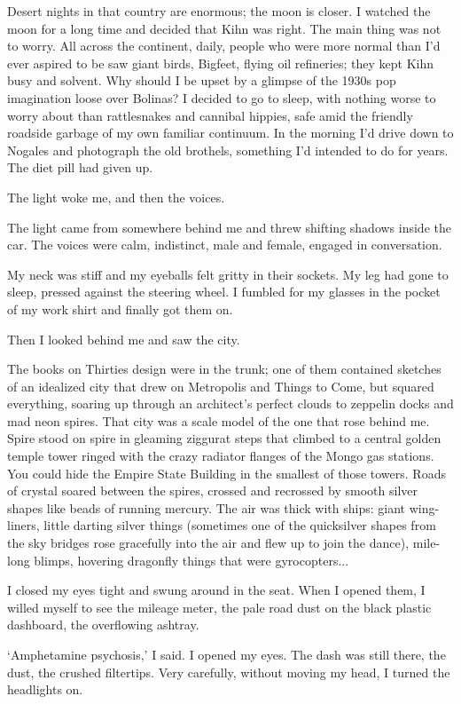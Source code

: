 Desert nights in that country are enormous; the moon is closer. I watched the moon for a long time and decided that Kihn was right. The main thing was not to worry. All across the continent, daily, people who were more normal than I'd ever aspired to be saw giant birds, Bigfeet, flying oil refineries; they kept Kihn busy and solvent. Why should I be upset by a glimpse of the 1930s pop imagination loose over Bolinas? I decided to go to sleep, with nothing worse to worry about than rattlesnakes and cannibal hippies, safe amid the friendly roadside garbage of my own familiar continuum. In the morning I'd drive down to Nogales and photograph the old brothels, something I'd intended to do for years. The diet pill had given up.

The light woke me, and then the voices.

The light came from somewhere behind me and threw shifting shadows inside the car. The voices were calm, indistinct, male and female, engaged in conversation.

My neck was stiff and my eyeballs felt gritty in their sockets. My leg had gone to sleep, pressed against the steering wheel. I fumbled for my glasses in the pocket of my work shirt and finally got them on.

Then I looked behind me and saw the city.

The books on Thirties design were in the trunk; one of them contained sketches of an idealized city that drew on Metropolis and Things to Come, but squared everything, soaring up through an architect's perfect clouds to zeppelin docks and mad neon spires. That city was a scale model of the one that rose behind me. Spire stood on spire in gleaming ziggurat steps that climbed to a central golden temple tower ringed with the crazy radiator flanges of the Mongo gas stations. You could hide the Empire State Building in the smallest of those towers. Roads of crystal soared between the spires, crossed and recrossed by smooth silver shapes like beads of running mercury. The air was thick with ships: giant wing-liners, little darting silver things (sometimes one of the quicksilver shapes from the sky bridges rose gracefully into the air and flew up to join the dance), mile-long blimps, hovering dragonfly things that were gyrocopters...

I closed my eyes tight and swung around in the seat. When I opened them, I willed myself to see the mileage meter, the pale road dust on the black plastic dashboard, the overflowing ashtray.

`Amphetamine psychosis,' I said. I opened my eyes. The dash was still there, the dust, the crushed filtertips. Very carefully, without moving my head, I turned the headlights on.

